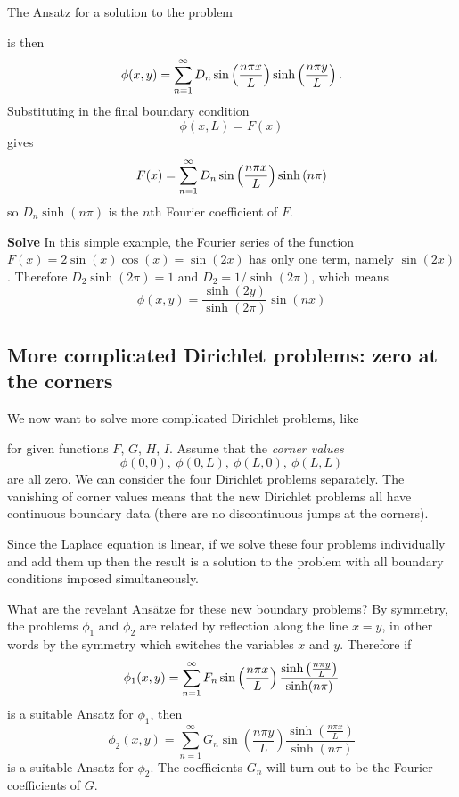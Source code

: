 The Ansatz for a solution to the problem


is then
\[\phi(x,y)=\sum_{n=1}^{\infty}D_n\sin\left(\frac{n \pi x}{L}\right)\sinh\left(\frac{n\pi y}{L}\right).\]
Substituting in the final boundary condition
\[\phi(x,L)=F(x)\]
gives
\[F(x)=\sum_{n=1}^{\infty}D_n\sin\left(\frac{n \pi x}{L}\right)\sinh\left(n\pi\right)\]
so $D_n\sinh(n\pi)$ is the $n$th Fourier coefficient of $F$.

\begin{exm}\label{exm:dirichl}
{\bf Solve}
In this simple example, the Fourier series of the function $F(x)=2\sin(x)\cos(x)=\sin(2x)$ has only one term, namely $\sin(2x)$. Therefore $D_2\sinh(2\pi)=1$ and $D_2=1/\sinh(2\pi)$, which means
\[\phi(x,y)=\frac{\sinh(2y)}{\sinh(2\pi)}\sin(nx)\]
\end{exm}

\subsection{More complicated Dirichlet problems: zero at the corners}

We now want to solve more complicated Dirichlet problems, like


for given functions $F$, $G$, $H$, $I$. Assume that the {\em corner values}
\[\phi(0,0),\ \phi(0,L),\ \phi(L,0),\ \phi(L,L)\]
are all zero. We can consider the four Dirichlet problems separately. The vanishing of corner values means that the new Dirichlet problems all have continuous boundary data (there are no discontinuous jumps at the corners).


Since the Laplace equation is linear, if we solve these four problems individually and add them up then the result is a solution to the problem with all boundary conditions imposed simultaneously.

What are the revelant Ans\"{a}tze for these new boundary problems? By symmetry, the problems $\phi_1$ and $\phi_2$ are related by reflection along the line $x=y$, in other words by the symmetry which switches the variables $x$ and $y$. Therefore if
\[\phi_1(x,y)=\sum_{n=1}^{\infty}F_n\sin\left(\frac{n \pi x}{L}\right)\frac{\sinh\left(\frac{n\pi y}{L}\right)}{\sinh(n\pi)}\]
is a suitable Ansatz for $\phi_1$, then
\[\phi_2(x,y)=\sum_{n=1}^{\infty}G_n\sin\left(\frac{n\pi y}{L}\right)\frac{\sinh\left(\frac{n\pi x}{L}\right)}{\sinh(n\pi)}\]
is a suitable Ansatz for $\phi_2$. The coefficients $G_n$ will turn out to be the Fourier coefficients of $G$.

